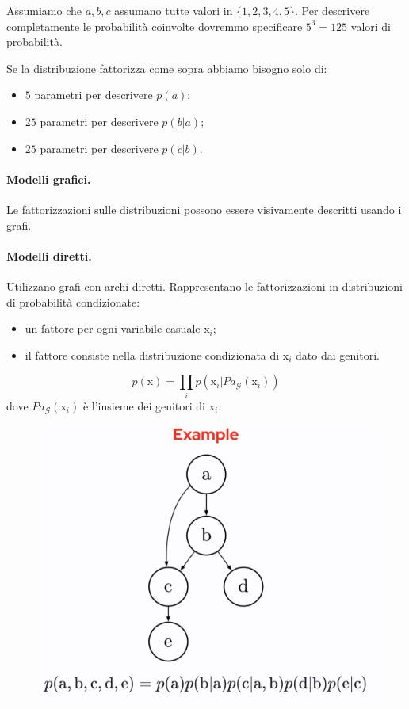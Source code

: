 Assumiamo che $a,b,c$ assumano tutte valori in $\{1,2,3,4,5\}$. Per descrivere completamente le probabilità coinvolte dovremmo specificare $5^3=125$ valori di probabilità.


Se la distribuzione fattorizza come sopra abbiamo bisogno solo di:
\begin{itemize}
    \item $5$ parametri per descrivere $p(a)$;
    \item $25$ parametri per descrivere $p(b|a)$;
    \item $25$ parametri per descrivere $p(c|b)$.
\end{itemize}

\paragraph{Modelli grafici.} Le fattorizzazioni sulle distribuzioni possono essere visivamente descritti usando i grafi.
\paragraph{Modelli diretti.} Utilizzano grafi con archi diretti. Rappresentano le fattorizzazioni in distribuzioni di probabilità condizionate:
\begin{itemize}
    \item un fattore per ogni variabile casuale x$_i$;
    \item il fattore consiste nella distribuzione condizionata di x$_i$ dato dai genitori.
\end{itemize}
\begin{equation}
    p(\text{x})=\prod_i p(\text{x}_i|Pa_{\mathcal{G}}(\text{x}_i))
\end{equation}
dove $Pa_{\mathcal{G}}(\text{x}_i)$ è l'insieme dei genitori di x$_i$.
\begin{figure}[!h]
    \includegraphics[scale=.5]{images/prerequisites/graphModelDir.png}
    \centering
\end{figure}
\newpage
